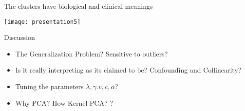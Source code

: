 \documentclass[
  10pt,
  ignorenonframetext,
]{beamer}
\providecommand{\tightlist}{%
  \setlength{\itemsep}{0pt}\setlength{\parskip}{0pt}}
\begin{document}
\begin{frame}{The clusters have biological and clinical meanings}
\protect\hypertarget{the-clusters-have-biological-and-clinical-meanings}{}
\begin{center}\texttt{[image: presentation5]} \end{center}
\end{frame}

\begin{frame}{Discussion}
\protect\hypertarget{discussion}{}
\begin{itemize}
\tightlist
\item
  The Generalization Problem? Sensitive to outliers?
\item
  Is it really interpreting as its claimed to be? Confounding and
  Collinearity?
\item
  Tuning the parameters \(\lambda, \gamma. v, c, \alpha\)?
\item
  Why PCA? How Kernel PCA? ?
\end{itemize}
\end{frame}
\end{document}
